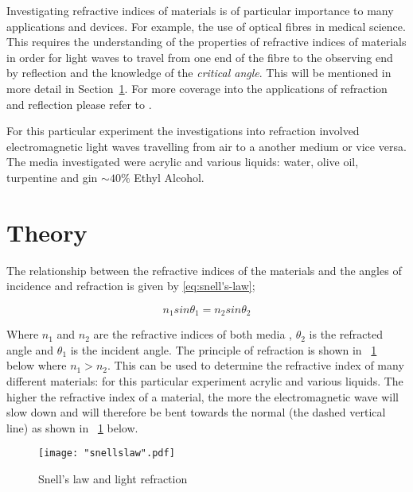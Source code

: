 \documentclass{article}
\newcommand{\figref}[2][\figurename~]{#1\ref{#2}}
\newcommand{\secref}[2][Section~]{#1\ref{#2}}
\begin{document}
\vspace{2mm}
\noindent
Investigating refractive indices of materials is of particular importance to many applications and devices. For example, the use of optical fibres in medical science. This requires the understanding of the properties of refractive indices of materials in order for light waves to travel from one end of the fibre to the observing end by reflection and the knowledge of the \textit{critical angle}. This will be mentioned in more detail in \secref{sec:theory}. For more coverage into the applications of refraction and reflection please refer to \cite{Book01}.

\vspace{2mm}
\noindent
For this particular experiment the investigations into refraction involved electromagnetic light waves travelling from air to a another medium or vice versa. The media investigated were acrylic and various liquids: water, olive oil, turpentine and gin $\sim40\%$ Ethyl Alcohol.


\section{Theory}
\label{sec:theory}

The relationship between the refractive indices of the materials and the angles of incidence and refraction is given by \eqref{eq:snell's-law};


\begin{equation}
\label{eq:snell's-law}
n_1sin\theta_1 = n_2sin\theta_2 
\end{equation}

\vspace{2mm}
\noindent
Where $n_1$ and $n_2$ are the refractive indices of both media \cite{Paper01}, $\theta_2$ is the refracted angle and $\theta_1$ is the incident angle. The principle of refraction is shown in \figref{fig:snell's-law} below where $n_1>n_2$. This can be used to determine the refractive index of many different materials: for this particular experiment acrylic and various liquids. The higher the refractive index of a material, the more the electromagnetic wave will slow down and will therefore be bent towards the normal (the dashed vertical line) as shown in \figref{fig:snell's-law} below.

\begin{figure}[h]
\centering
\texttt{[image: "snellslaw".pdf]}
\caption{Snell's law and light refraction}
\label{fig:snell's-law}
\end{figure}
\end{document}
